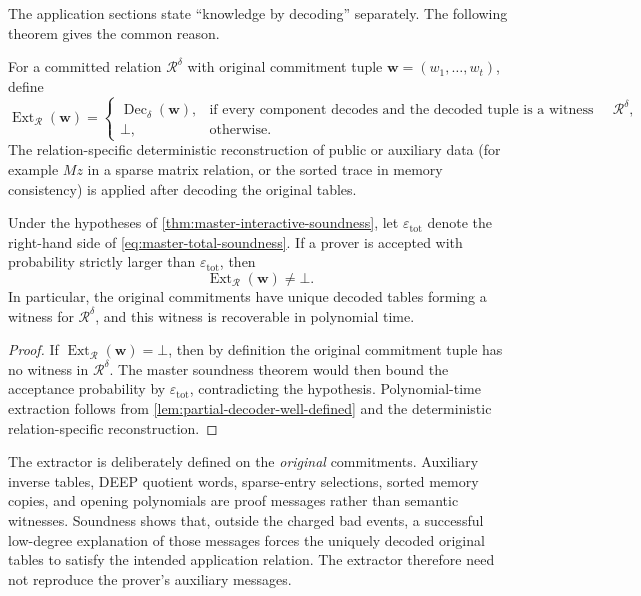 The application sections state ``knowledge by decoding'' separately.  The following theorem gives the common reason.

\begin{definition}
\label{def:application-decoder}
For a committed relation $\mathcal R^\delta$ with original commitment tuple $\mathbf w=(w_1,\ldots,w_t)$, define
\[
  \operatorname{Ext}_{\mathcal R}(\mathbf w)
  =
  \begin{cases}
    \operatorname{Dec}_\delta(\mathbf w),&\text{if every component decodes and the decoded tuple is a witness for }\mathcal R^\delta,\\
    \bot,&\text{otherwise.}
  \end{cases}
\]
The relation-specific deterministic reconstruction of public or auxiliary data (for example $Mz$ in a sparse matrix relation, or the sorted trace in memory consistency) is applied after decoding the original tables.
\end{definition}

\begin{theorem}
\label{thm:global-decoding-knowledge}
Under the hypotheses of \cref{thm:master-interactive-soundness}, let $\varepsilon_{\mathrm{tot}}$ denote the right-hand side of \eqref{eq:master-total-soundness}.  If a prover is accepted with probability strictly larger than $\varepsilon_{\mathrm{tot}}$, then
\[
  \operatorname{Ext}_{\mathcal R}(\mathbf w)\ne\bot.
\]
In particular, the original commitments have unique decoded tables forming a witness for $\mathcal R^\delta$, and this witness is recoverable in polynomial time.
\end{theorem}

\begin{proof}
If $\operatorname{Ext}_{\mathcal R}(\mathbf w)=\bot$, then by definition the original commitment tuple has no witness in $\mathcal R^\delta$.  The master soundness theorem would then bound the acceptance probability by $\varepsilon_{\mathrm{tot}}$, contradicting the hypothesis.  Polynomial-time extraction follows from \cref{lem:partial-decoder-well-defined} and the deterministic relation-specific reconstruction.
\end{proof}

\begin{remark}
\label{rem:global-extractor-scope}
The extractor is deliberately defined on the \emph{original} commitments.  Auxiliary inverse tables, DEEP quotient words, sparse-entry selections, sorted memory copies, and opening polynomials are proof messages rather than semantic witnesses.  Soundness shows that, outside the charged bad events, a successful low-degree explanation of those messages forces the uniquely decoded original tables to satisfy the intended application relation.  The extractor therefore need not reproduce the prover's auxiliary messages.
\end{remark}

